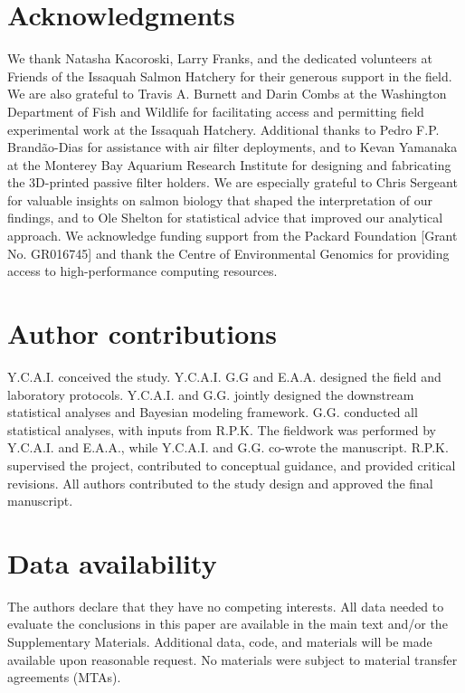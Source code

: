 \documentclass{article}
\begin{document}
\section*{Acknowledgments}
We thank Natasha Kacoroski, Larry Franks, and the dedicated volunteers at Friends of the Issaquah Salmon Hatchery for their generous support in the field. We are also grateful to Travis A. Burnett and Darin Combs at the Washington Department of Fish and Wildlife for facilitating access and permitting field experimental work at the Issaquah Hatchery. Additional thanks to Pedro F.P. Brandão-Dias for assistance with air filter deployments, and to Kevan Yamanaka at the Monterey Bay Aquarium Research Institute for designing and fabricating the 3D-printed passive filter holders. We are especially grateful to Chris Sergeant for valuable insights on salmon biology that shaped the interpretation of our findings, and to Ole Shelton for statistical advice that improved our analytical approach. We acknowledge funding support from the Packard Foundation [Grant No. GR016745] and thank the Centre of Environmental Genomics for providing access to high-performance computing resources.

\section*{Author contributions}
Y.C.A.I. conceived the study. Y.C.A.I. G.G and E.A.A. designed the field and laboratory protocols. Y.C.A.I. and G.G. jointly designed the downstream statistical analyses and Bayesian modeling framework. G.G. conducted all statistical analyses, with inputs from R.P.K. The fieldwork was performed by Y.C.A.I. and E.A.A., while Y.C.A.I. and G.G. co-wrote the manuscript. R.P.K. supervised the project, contributed to conceptual guidance, and provided critical revisions. All authors contributed to the study design and approved the final manuscript.  

\section*{Data availability}
The authors declare that they have no competing interests. All data needed to evaluate the conclusions in this paper are available in the main text and/or the Supplementary Materials. Additional data, code, and materials will be made available upon reasonable request. No materials were subject to material transfer agreements (MTAs).

\clearpage

\end{document}
